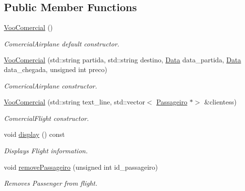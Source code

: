 \subsection*{Public Member Functions}
\begin{DoxyCompactItemize}
\item 
\mbox{\label{class_voo_comercial_a6eb11753551288e403d4777fd6fc3217}} 
\hyperlink{class_voo_comercial_a6eb11753551288e403d4777fd6fc3217}{Voo\+Comercial} ()
\begin{DoxyCompactList}\small\item\em Comercial\+Airplane default constructor. \end{DoxyCompactList}\item 
\hyperlink{class_voo_comercial_ae4918a17277f8d1f9b237fced4f4d982}{Voo\+Comercial} (std\+::string partida, std\+::string destino, \hyperlink{class_data}{Data} data\+\_\+partida, \hyperlink{class_data}{Data} data\+\_\+chegada, unsigned int preco)
\begin{DoxyCompactList}\small\item\em Comerical\+Airplane constructor. \end{DoxyCompactList}\item 
\hyperlink{class_voo_comercial_a5ebc0abcd90d84799d8fbb0902180f36}{Voo\+Comercial} (std\+::string text\+\_\+line, std\+::vector$<$ \hyperlink{class_passageiro}{Passageiro} $\ast$$>$ \&clientess)
\begin{DoxyCompactList}\small\item\em Comercial\+Flight constructor. \end{DoxyCompactList}\item 
\mbox{\label{class_voo_comercial_a31cd6333ce38a47401e866a7d0c1cb11}} 
void \hyperlink{class_voo_comercial_a31cd6333ce38a47401e866a7d0c1cb11}{display} () const
\begin{DoxyCompactList}\small\item\em Displays Flight information. \end{DoxyCompactList}\item 
void \hyperlink{class_voo_comercial_a7e9904d20f1dc6908d98d7ccebd1fbb2}{remove\+Passageiro} (unsigned int id\+\_\+passageiro)
\begin{DoxyCompactList}\small\item\em Removes Passenger from flight. \end{DoxyCompactList}\item 
$$
\end{DoxyCompactItemize}
